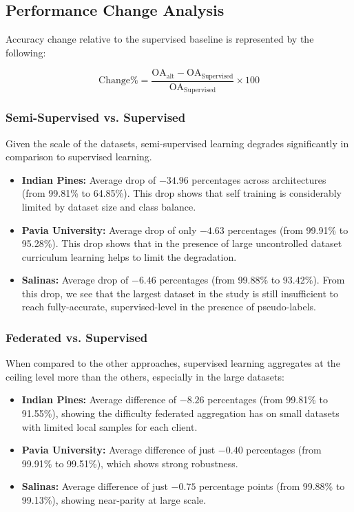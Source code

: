 \subsection{Performance Change Analysis}
Accuracy change relative to the supervised baseline is represented by the following:

\begin{equation}
    \text{Change\%} = \frac{\text{OA}_{\text{alt}} - \text{OA}_{\text{Supervised}}}{\text{OA}_{\text{Supervised}}} \times 100
    \label{eq:improvement}
\end{equation}

\subsubsection{Semi-Supervised vs. Supervised}
Given the scale of the datasets, semi-supervised learning degrades significantly in comparison to supervised learning.
\begin{itemize}
    \item \textbf{Indian Pines:} Average drop of $-34.96$ percentages across architectures (from 99.81\% to 64.85\%). This drop shows that self training is considerably limited by dataset size and class balance.
    \item \textbf{Pavia University:} Average drop of only $-4.63$ percentages (from 99.91\% to 95.28\%). This drop shows that in the presence of large uncontrolled dataset curriculum learning helps to limit the degradation.
    \item \textbf{Salinas:} Average drop of $-6.46$ percentages (from 99.88\% to 93.42\%). From this drop, we see that the largest dataset in the study is still insufficient to reach fully-accurate, supervised-level in the presence of pseudo-labels.
\end{itemize}

\subsubsection{Federated vs. Supervised}
When compared to the other approaches, supervised learning aggregates at the ceiling level more than the others, especially in the large datasets:
\begin{itemize}
    \item \textbf{Indian Pines:} Average difference of $-8.26$ percentages (from 99.81\% to 91.55\%), showing the difficulty federated aggregation has on small datasets with limited local samples for each client.
    \item \textbf{Pavia University:} Average difference of just $-0.40$ percentages (from 99.91\% to 99.51\%), which shows strong robustness.
    \item \textbf{Salinas:} Average difference of just $-0.75$ percentage points (from 99.88\% to 99.13\%), showing near-parity at large scale.
\end{itemize}


